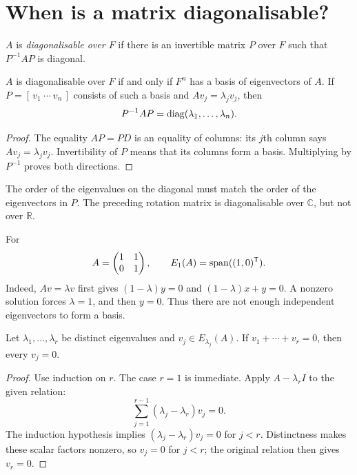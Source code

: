 \section{When is a matrix diagonalisable?}

\begin{definition}
$A$ is \emph{diagonalisable over $F$} if there is an invertible matrix
$P$ over $F$ such that $P^{-1}AP$ is diagonal.
\end{definition}

\begin{theorem}
$A$ is diagonalisable over $F$ if and only if $F^n$ has a basis of
eigenvectors of $A$.
If $P=[\,v_1\ \cdots\ v_n\,]$ consists of such a basis and
$Av_j=\lambda_jv_j$, then
\[
 P^{-1}AP=\operatorname{diag}(\lambda_1,\ldots,\lambda_n).
\]
\end{theorem}
\begin{proof}
The equality $AP=PD$ is an equality of columns:
its $j$th column says $Av_j=\lambda_jv_j$.
Invertibility of $P$ means that its columns form a basis.
Multiplying by $P^{-1}$ proves both directions.
\end{proof}

The order of the eigenvalues on the diagonal must match the order of the
eigenvectors in $P$.
The preceding rotation matrix is diagonalisable over $\mathbb C$, but not
over $\mathbb R$.

\begin{example}
For
\[
 A=\begin{pmatrix}1&1\\0&1\end{pmatrix},
 \qquad E_1(A)=\operatorname{span}((1,0)^{\mathsf T}).
\]
Indeed, $Av=\lambda v$ first gives
$(1-\lambda)y=0$ and $(1-\lambda)x+y=0$.
A nonzero solution forces $\lambda=1$, and then $y=0$.
Thus there are not enough independent eigenvectors to form a basis.
\end{example}

\begin{lemma}
Let $\lambda_1,\ldots,\lambda_r$ be distinct eigenvalues and
$v_j\in E_{\lambda_j}(A)$.
If $v_1+\cdots+v_r=0$, then every $v_j=0$.
\end{lemma}
\begin{proof}
Use induction on $r$. The case $r=1$ is immediate.
Apply $A-\lambda_r I$ to the given relation:
\[
 \sum_{j=1}^{r-1}(\lambda_j-\lambda_r)v_j=0.
\]
The induction hypothesis implies
$(\lambda_j-\lambda_r)v_j=0$ for $j<r$.
Distinctness makes these scalar factors nonzero, so $v_j=0$ for $j<r$;
the original relation then gives $v_r=0$.
\end{proof}

